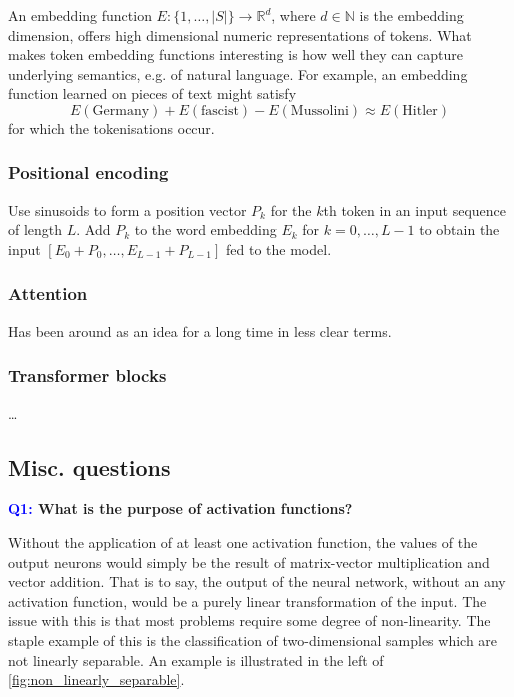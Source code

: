 \documentclass[11pt]{article}
\begin{document}
An embedding function $E:\{1,\dots,|S|\}\to\mathbb{R}^d$, where $d\in\mathbb{N}$ is the embedding dimension, offers high dimensional numeric representations of tokens. What makes token embedding functions interesting is how well they can capture underlying semantics, e.g. of natural language. For example, an embedding function learned on pieces of text might satisfy
$$
E(\text{Germany})+E(\text{fascist})-E(\text{Mussolini})
\approx
E(\text{Hitler})
$$
for which the tokenisations occur.

\subsubsection{Positional encoding}
Use sinusoids to form a position vector $P_k$ for the $k$th token in an input sequence of length $L$. Add $P_k$ to the word embedding $E_k$ for $k=0,\dots,L-1$ to obtain the input $[E_0+P_0,\dots,E_{L-1}+P_{L-1}]$ fed to the model.

\subsubsection{Attention}
Has been around as an idea for a long time in less clear terms.

\subsubsection{Transformer blocks}
\dots

\subsection{Misc. questions}

\begin{center}
    \textbf{\textcolor{blue}{Q1:} What is the purpose of activation functions?}
\end{center}
Without the application of at least one activation function, the values of the output neurons would simply be the result of matrix-vector multiplication and vector addition. That is to say, the output of the neural network, without an any activation function, would be a purely linear transformation of the input. The issue with this is that most problems require some degree of non-linearity. The staple example of this is the classification of two-dimensional samples which are not linearly separable. An example is illustrated in the left of \autoref{fig:non_linearly_separable}.
\end{document}
